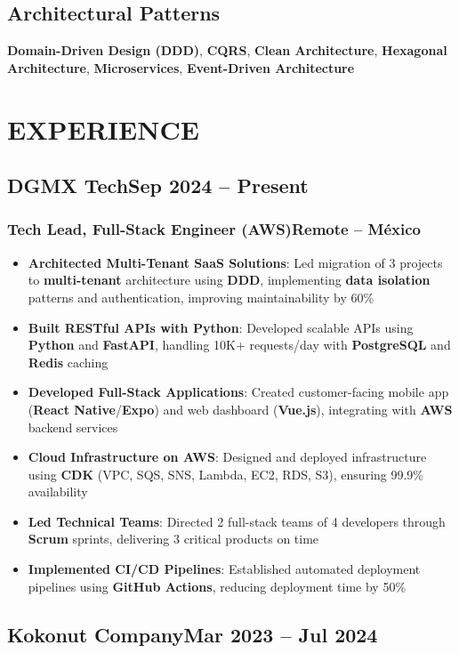 \documentclass[a4paper,10pt]{article}
\newcommand{\kw}[1]{\textbf{\textcolor{keyword}{#1}}}
\newcommand{\tech}[1]{\textbf{\textcolor{tech}{#1}}}
\begin{document}
\subsection*{Architectural Patterns}
\kw{Domain-Driven Design (DDD)}, \kw{CQRS}, \kw{Clean Architecture}, \kw{Hexagonal Architecture}, \kw{Microservices}, \kw{Event-Driven Architecture}

\section*{EXPERIENCE}

\subsection*{DGMX Tech\hfill\textbf{Sep 2024 -- Present}}
\subsubsection*{Tech Lead, Full-Stack Engineer (AWS)\hfill Remote -- México}
\begin{itemize}[noitemsep, leftmargin=*]
    \item \textbf{Architected Multi-Tenant SaaS Solutions}: Led migration of 3 projects to \kw{multi-tenant} architecture using \kw{DDD}, implementing \kw{data isolation} patterns and authentication, improving maintainability by 60\%
    \item \textbf{Built RESTful APIs with Python}: Developed scalable APIs using \tech{Python} and \tech{FastAPI}, handling 10K+ requests/day with \kw{PostgreSQL} and \tech{Redis} caching
    \item \textbf{Developed Full-Stack Applications}: Created customer-facing mobile app (\tech{React Native}/\tech{Expo}) and web dashboard (\tech{Vue.js}), integrating with \tech{AWS} backend services
    \item \textbf{Cloud Infrastructure on AWS}: Designed and deployed infrastructure using \tech{CDK} (VPC, SQS, SNS, Lambda, EC2, RDS, S3), ensuring 99.9\% availability
    \item \textbf{Led Technical Teams}: Directed 2 full-stack teams of 4 developers through \kw{Scrum} sprints, delivering 3 critical products on time
    \item \textbf{Implemented CI/CD Pipelines}: Established automated deployment pipelines using \tech{GitHub Actions}, reducing deployment time by 50\%
\end{itemize}

\subsection*{Kokonut Company\hfill\textbf{Mar 2023 -- Jul 2024}}
\end{document}
